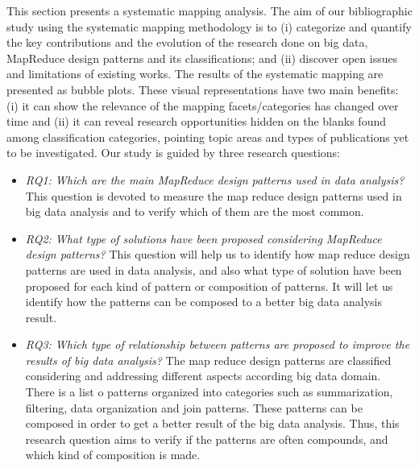This section presents a systematic mapping analysis. The aim of our
bibliographic study using the systematic mapping methodology
\cite{Petersen:2008} is to (i) categorize and quantify the key contributions and
the evolution of the research done on big data, MapReduce design patterns and
its classifications; and (ii) discover open issues and limitations of existing works.
The results of the systematic mapping are presented as
bubble plots. These visual representations have two main
benefits: (i) it can show the relevance of the mapping facets/categories
has changed over time and (ii) it can reveal research opportunities
hidden on the blanks found among classification categories, pointing
topic areas and types of publications yet to be investigated. Our study is guided
by three research questions:

\begin{itemize}
\item {\em RQ1: Which are the main MapReduce design patterns used in data
analysis?} This question is devoted to measure the map reduce design patterns
used in big data analysis and to verify which of them are the most common.

\item {\em RQ2: What type of solutions have been proposed considering MapReduce
design patterns?} This question will help us to identify how map reduce design patterns are used in data analysis, and also
what type of solution have been proposed for each kind of pattern or
composition of patterns. It will let us identify how the patterns can be
composed to a better big data analysis result.
 
\item  {\em RQ3: Which type of relationship between patterns are proposed to
improve the results of big data analysis?} The map reduce design patterns are
classified considering and addressing different aspects
according big data domain. There is a list o patterns organized into categories
such as summarization, filtering, data organization and join patterns. These
patterns can be composed in order to get a better result of the big data
analysis. Thus, this research question aims to verify if the patterns are often
compounds, and which kind of composition is made.
\end{itemize} 


